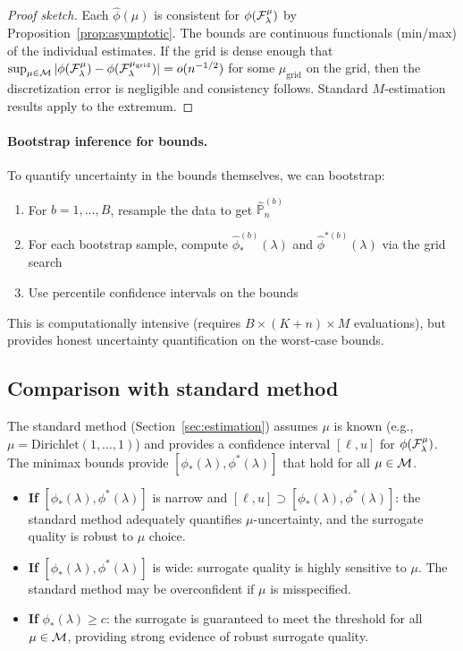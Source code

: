 \documentclass{article}
\newcommand{\PP}{\mathbb{P}}
\begin{document}
\begin{proof}[Proof sketch]
Each $\hat{\phi}(\mu)$ is consistent for $\phi(\mathcal{F}_\lambda^\mu)$ by Proposition~\ref{prop:asymptotic}. The bounds are continuous functionals (min/max) of the individual estimates. If the grid is dense enough that $\sup_{\mu \in \mathcal{M}} |\phi(\mathcal{F}_\lambda^\mu) - \phi(\mathcal{F}_\lambda^{\mu_{\text{grid}}})| = o(n^{-1/2})$ for some $\mu_{\text{grid}}$ on the grid, then the discretization error is negligible and consistency follows. Standard $M$-estimation results apply to the extremum.
\end{proof}

\paragraph{Bootstrap inference for bounds.}
To quantify uncertainty in the bounds themselves, we can bootstrap:
\begin{enumerate}
    \item For $b = 1, \ldots, B$, resample the data to get $\hat{\PP}_n^{(b)}$
    \item For each bootstrap sample, compute $\hat{\phi}_*^{(b)}(\lambda)$ and $\hat{\phi}^{*(b)}(\lambda)$ via the grid search
    \item Use percentile confidence intervals on the bounds
\end{enumerate}

This is computationally intensive (requires $B \times (K + n) \times M$ evaluations), but provides honest uncertainty quantification on the worst-case bounds.

\subsection{Comparison with standard method}

The standard method (Section~\ref{sec:estimation}) assumes $\mu$ is known (e.g., $\mu = \text{Dirichlet}(1, \ldots, 1)$) and provides a confidence interval $[\ell, u]$ for $\phi(\mathcal{F}_\lambda^\mu)$. The minimax bounds provide $[\phi_*(\lambda), \phi^*(\lambda)]$ that hold for all $\mu \in \mathcal{M}$.

\begin{itemize}
    \item \textbf{If} $[\phi_*(\lambda), \phi^*(\lambda)]$ is narrow and $[\ell, u] \supset [\phi_*(\lambda), \phi^*(\lambda)]$: the standard method adequately quantifies $\mu$-uncertainty, and the surrogate quality is robust to $\mu$ choice.

    \item \textbf{If} $[\phi_*(\lambda), \phi^*(\lambda)]$ is wide: surrogate quality is highly sensitive to $\mu$. The standard method may be overconfident if $\mu$ is misspecified.

    \item \textbf{If} $\phi_*(\lambda) \geq c$: the surrogate is guaranteed to meet the threshold for all $\mu \in \mathcal{M}$, providing strong evidence of robust surrogate quality.
\end{itemize}
\end{document}
